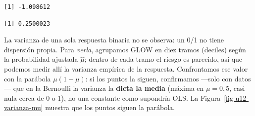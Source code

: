 \documentclass[
  letterpaper,
  DIV=11,
  numbers=noendperiod]{scrartcl}
\newenvironment{Shaded}{\begin{snugshade}}{\end{snugshade}}
\newcommand{\CommentTok}[1]{\textcolor[rgb]{0.37,0.37,0.37}{#1}}
\newcommand{\FloatTok}[1]{\textcolor[rgb]{0.68,0.00,0.00}{#1}}
\newcommand{\FunctionTok}[1]{\textcolor[rgb]{0.28,0.35,0.67}{#1}}
\newcommand{\NormalTok}[1]{\textcolor[rgb]{0.00,0.23,0.31}{#1}}
\newcommand{\SpecialCharTok}[1]{\textcolor[rgb]{0.37,0.37,0.37}{#1}}
\begin{document}
\begin{Shaded}
\end{Shaded}

\begin{verbatim}
[1] -1.098612
\end{verbatim}

\begin{Shaded}
\end{Shaded}

\begin{verbatim}
[1] 0.2500023
\end{verbatim}

La varianza de una sola respuesta binaria no se observa: un 0/1 no tiene
dispersión propia. Para \emph{verla}, agrupamos GLOW en diez tramos
(deciles) según la probabilidad ajustada \(\hat\mu\); dentro de cada
tramo el riesgo es parecido, así que podemos medir allí la varianza
empírica de la respuesta. Confrontamos ese valor con la parábola
\(\mu(1-\mu)\): si los puntos la siguen, confirmamos ---solo con
datos--- que en la Bernoulli la varianza la \textbf{dicta la media}
(máxima en \(\mu=0{,}5\), casi nula cerca de 0 o 1), no una constante
como supondría OLS. La Figura~\ref{fig-u12-varianza-mu} muestra que los
puntos siguen la parábola.
\end{document}
